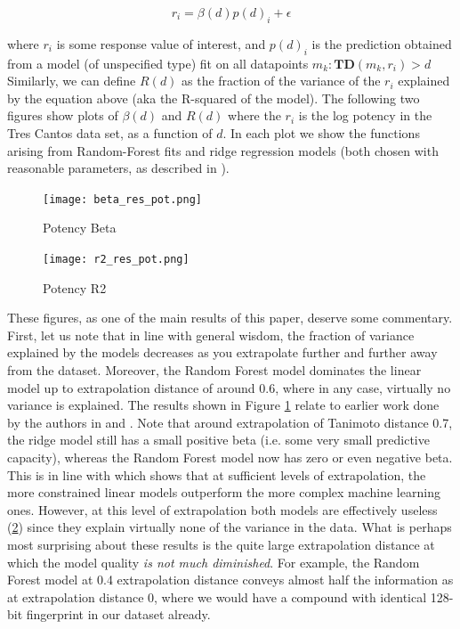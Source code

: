 \documentclass{article}
\begin{document}
\begin{equation}
    r_{i} = \beta(d) p(d)_{i} + \epsilon
\end{equation}

where $r_{i}$ is some response value of interest, and $p(d)_{i}$ is the prediction obtained from a model (of unspecified type) fit on all datapoints $m_{k} : \mathbf{TD}(m_{k}, r_{i}) > d$
\newline
\newline
Similarly, we can define $R(d)$ as the fraction of the variance  of the $r_{i}$ explained by the equation above  (aka the R-squared of the model).
\newline
\newline
The following two figures show plots of $\beta(d)$ and $R(d)$ where the $r_{i}$ is the log potency in the Tres Cantos data set, as a function of $d$.  In each plot we show the functions arising from Random-Forest fits and ridge regression models (both chosen with reasonable parameters, as described in \citep{et1:}).

\begin{figure}[h!]
\centering
\texttt{[image: beta\_res\_pot.png]}
\caption{Potency Beta}
\label{fig:potbeta}
\end{figure}

\begin{figure}[h!]
\centering
\texttt{[image: r2\_res\_pot.png]}
\caption{Potency R2}
\label{fig:potr2}
\end{figure}

These figures, as one of the main results of this paper, deserve some commentary. First, let us note that in line with general wisdom, the fraction of variance explained by the models decreases as you extrapolate further and further away from the dataset.  Moreover, the Random Forest model dominates the linear model up to extrapolation distance of around 0.6, where in any case, virtually no variance is explained.
\newline
\newline
The results shown in Figure \ref{fig:potbeta} relate to earlier work done by the authors in \citep{et0:} and \citep{et1:}.  Note that around extrapolation of Tanimoto distance 0.7, the ridge model still has a small positive beta (i.e. some very small predictive capacity), whereas the Random Forest model now has zero or even negative beta.  This is in line with \citep{et1:} which shows that at sufficient levels of extrapolation, the more constrained linear models outperform the more complex machine learning ones.  However, at this level of extrapolation both models are effectively useless (\ref{fig:potr2}) since they explain virtually none of the variance in the data.  
\newline
\newline
What is perhaps most surprising about these results is the quite large extrapolation distance at which the model quality \textit{is not much diminished}.  For example, the Random Forest model at 0.4 extrapolation distance conveys almost half the information as at extrapolation distance 0, where we would have a compound with identical 128-bit fingerprint in our dataset already.
\end{document}
